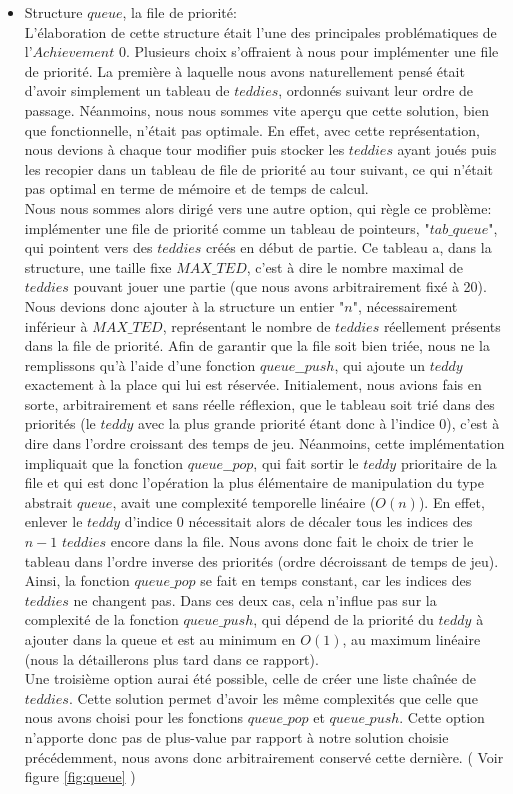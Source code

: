 \documentclass{article}
\begin{document}
\begin{itemize}
        \item Structure $queue$, la file de priorité:\\ 
    L'élaboration de cette structure était l'une des principales problématiques de l'$Achievement$ 0. Plusieurs choix s'offraient à nous pour implémenter une file de priorité. La première à laquelle nous avons naturellement pensé était d'avoir simplement un tableau de $teddies$, ordonnés suivant leur ordre de passage. Néanmoins, nous nous sommes vite aperçu que cette solution, bien que fonctionnelle, n'était pas optimale. En effet, avec cette représentation, nous devions à chaque tour modifier puis stocker les $teddies$ ayant joués puis les recopier dans un tableau de file de priorité au tour suivant, ce qui n'était pas optimal en terme de mémoire et de temps de calcul.\\
    Nous nous sommes alors dirigé vers une autre option, qui règle ce problème: implémenter une file de priorité comme un tableau de pointeurs, "$tab\_queue$", qui pointent vers des $teddies$ créés en début de partie. Ce tableau a, dans la structure, une taille fixe $MAX\_TED$, c'est à dire le nombre maximal de $teddies$ pouvant jouer une partie (que nous avons arbitrairement fixé à 20). Nous devions donc ajouter à la structure un entier "$n$", nécessairement inférieur à $MAX\_TED$, représentant le nombre de $teddies$ réellement présents dans la file de priorité. Afin de garantir que la file soit bien triée, nous ne la remplissons qu'à l'aide d'une fonction $queue\_\_push$, qui ajoute un $teddy$ exactement à la place qui lui est réservée. Initialement, nous avions fais en sorte, arbitrairement et sans réelle réflexion, que le tableau soit trié dans des priorités (le $teddy$ avec la plus grande priorité étant donc à l'indice 0), c'est à dire dans l'ordre croissant des temps de jeu. Néanmoins, cette implémentation impliquait que la fonction $queue\_\_pop$, qui fait sortir le $teddy$ prioritaire de la file et qui est donc l'opération la plus élémentaire de manipulation du type abstrait $queue$, avait une complexité temporelle linéaire ($O (n)$). En effet, enlever le $teddy$ d'indice 0 nécessitait alors de décaler tous les indices des $n-1$ $teddies$ encore dans la file. Nous avons donc fait le choix de trier le tableau dans l'ordre inverse des priorités (ordre décroissant de temps de jeu). Ainsi, la fonction $queue\_pop$ se fait en temps constant, car les indices des $teddies$ ne changent pas. Dans ces deux cas, cela n'influe pas sur la complexité de la fonction $queue\_push$, qui dépend de la priorité du $teddy$ à ajouter dans la queue et est au minimum en $O (1)$, au maximum linéaire (nous la détaillerons plus tard dans ce rapport).   \\
    Une troisième option aurai été possible, celle de créer une liste chaînée de $teddies$. Cette solution permet d'avoir les même complexités que celle que nous avons choisi pour les fonctions $queue\_pop$ et $queue\_push$. Cette option n'apporte donc pas de plus-value par rapport à notre solution choisie précédemment, nous avons donc arbitrairement conservé cette dernière. ( Voir figure \ref{fig:queue} )   \\
    \end{itemize}
    
\end{document}
